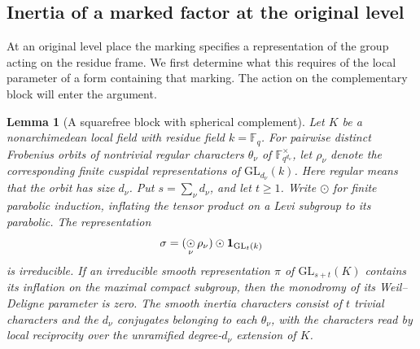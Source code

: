 \documentclass[a4paper,11pt]{article}
\newtheorem{lemma}[proposition]{Lemma}
\theoremstyle{definition}
\theoremstyle{remark}
\numberwithin{equation}{section}
\begin{document}
\subsection{Inertia of a marked factor at the original level}
\label{sec:markedlevel801}
At an original level place the marking specifies a representation of
the group acting on the residue frame. We first determine what this
requires of the local parameter of a form containing that marking.
The action on the complementary block will enter the argument.

\begin{lemma}[A squarefree block with spherical complement]
\leavevmode\label{lem:finitemark801}
Let \(K\) be a nonarchimedean local field with residue field
\(k=\mathbb F_q\). For pairwise distinct Frobenius orbits of
nontrivial regular characters \(\theta_\nu\) of
\(\mathbb F_{q^{d_\nu}}^\times\), let \(\rho_\nu\) denote the
corresponding finite cuspidal representations of
\(\mathrm{GL}_{d_\nu}(k)\). Here regular means that the orbit
has size \(d_\nu\). Put \(s=\sum_\nu d_\nu\), and let \(t\ge1\).
Write \(\odot\) for finite parabolic induction, inflating the
tensor product on a Levi subgroup to its parabolic. The representation
\[
              \sigma=(\mathop{\odot}_{\nu}\rho_\nu)
                            \odot{\bf1}_{\mathrm{GL}_t(k)}
\]
is irreducible. If an irreducible smooth representation \(\pi\)
of \(\mathrm{GL}_{s+t}(K)\) contains its inflation on the maximal
compact subgroup, then the monodromy of its Weil--Deligne parameter
is zero. The smooth inertia characters consist of \(t\) trivial
characters and the \(d_\nu\) conjugates belonging to each
\(\theta_\nu\), with the characters read by local reciprocity over
the unramified degree-\(d_\nu\) extension of \(K\).
\end{lemma}
\end{document}
